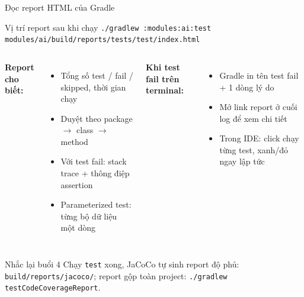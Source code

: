 \documentclass[aspectratio=169,12pt]{beamer}
\begin{document}
\begin{frame}[shrink=8]{Đọc report HTML của Gradle}
  \begin{block}{Vị trí report sau khi chạy \texttt{./gradlew :modules:ai:test}}
    \texttt{modules/ai/build/reports/tests/test/index.html}
  \end{block}

  \vspace{0.35em}
  \begin{columns}
    \textbf{Report cho biết:}
    \begin{itemize}
      \item Tổng số test / fail / skipped, thời gian chạy
      \item Duyệt theo package \(\to\) class \(\to\) method
      \item Với test fail: stack trace + thông điệp assertion
      \item Parameterized test: từng bộ dữ liệu một dòng
    \end{itemize}

    \textbf{Khi test fail trên terminal:}
    \begin{itemize}
      \item Gradle in tên test fail + 1 dòng lý do
      \item Mở link report ở cuối log để xem chi tiết
      \item Trong IDE: click chạy từng test, xanh/đỏ ngay lập tức
    \end{itemize}
  \end{columns}

  \vspace{0.35em}
  \begin{exampleblock}{Nhắc lại buổi 4}
    Chạy \texttt{test} xong, JaCoCo tự sinh report độ phủ:
    \texttt{build/reports/jacoco/}; report gộp toàn project:
    \texttt{./gradlew testCodeCoverageReport}.
  \end{exampleblock}
\end{frame}
\end{document}
